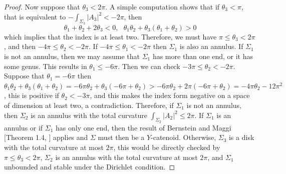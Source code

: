 \documentclass[11pt]{amsart}
\numberwithin{equation}{section}
\theoremstyle{theorem}
\theoremstyle{definition}
\numberwithin{equation}{section}
\begin{document}
\begin{proof}
Now suppose that $\theta_3< 2\pi$. A simple computation shows that if $\theta_3 <\pi$, that is equivalent to $-\int_{\Sigma_3}\vert A_3\vert^2 <-2\pi$, then\\
$$
\theta_1+\theta_2+2\theta_3<0, \ \ \ \theta_1\theta_2+\theta_3(\theta_1+\theta_2)>0
$$
which implies that the index is at least two. 
Therefore, we must have $\pi \leq \theta_3 < 2\pi$, and then $-4\pi \leq \theta_2 < -2\pi$. If $-4\pi\leq \theta_1<-2\pi$ then $\Sigma_1$ is also an annulus. If $\Sigma_1$ is not an annulus, then we may assume that $\Sigma_1$ has more than one end, or it has some genus. This results in $\theta_1 \leq-6\pi$.
Then we can check $-3\pi \leq \theta_2 <-2\pi$. Suppose that $\theta_1= -6\pi$ then $\theta_1\theta_2+\theta_3(\theta_1+\theta_2)= -6\pi \theta_2 +\theta_3 (-6\pi +\theta_2)>-6\pi \theta_2 + 2\pi (-6\pi +\theta_2)=-4\pi \theta_2-12\pi^2$, this is positive if $\theta_2< -3\pi$, and this makes the index form negative on a space of dimension at least two, a contradiction. Therefore, if $\Sigma_1$ is not an annulus, then $\Sigma_2$ is an annulus with the total curvature $\int_{\Sigma_2}\vert A_2\vert^2 \leq 2\pi$. If $\Sigma_1$ is an annulus or if $\Sigma_1$ has only one end, then the result of Bernstein and Maggi [Theorem 1.4, \cite{bernstein2021symmetry}] applies and $\Sigma$ must then be a $Y$-catenoid. Otherwise, $\Sigma_3$ is a disk with the total curvature at most $2\pi$, this would be directly checked by $\pi\leq \theta_3<2\pi$, $\Sigma_2$ is an annulus with the total curvature at most $2\pi$, and $\Sigma_1$ unbounded and stable under the Dirichlet condition.
\end{proof}
\end{document}
